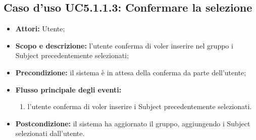 \subsection{Caso d'uso UC5.1.1.3: Confermare la selezione}
\begin{itemize}
\item \textbf{Attori:} Utente;
\item \textbf{Scopo e descrizione:} l'utente conferma di voler inserire nel gruppo i Subject\glossario{} precedentemente selezionati;
\item \textbf{Precondizione:} il sistema è in attesa della conferma da  parte dell'utente;
\item \textbf{Flusso principale degli eventi:}
\begin{enumerate}
\item l'utente conferma di voler inserire i Subject\glossario{} precedentemente selezionati.
\end{enumerate}
\item \textbf{Postcondizione:} il sistema ha aggiornato il gruppo, aggiungendo i Subject\glossario{} selezionati dall'utente.
\end{itemize}


